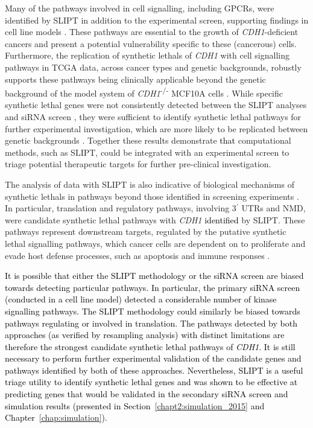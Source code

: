 Many of the pathways involved in cell signalling, including \glspl{GPCR}, were identified by \gls{SLIPT} in addition to the experimental screen, supporting findings in cell line models \citep{Telford2015}. These pathways are \gls{essential} to the growth of \textit{CDH1}-deficient cancers and present a potential vulnerability specific to these (cancerous) cells. Furthermore, the replication of \glspl{synthetic lethal} of \textit{CDH1} with cell signalling pathways in \gls{TCGA} data, across cancer types and genetic backgrounds, robustly supports these pathways being clinically applicable beyond the genetic background of the model system of \textit{CDH1}\textsuperscript{-/-} MCF10A cells \citep{Chen2014}. While specific \gls{synthetic lethal} genes were not consistently detected between the \gls{SLIPT} analyses and \gls{siRNA} screen \citep{Telford2015}, they were sufficient to identify \gls{synthetic lethal} pathways for further experimental investigation, which are more likely to be replicated between genetic backgrounds \citep{Dixon2008}. Together these results demonstrate \textcolor{black}{that} computational methods, such as \gls{SLIPT}, could be integrated with an experimental screen to triage potential therapeutic targets  for further pre-clinical investigation.

The analysis of  data with \gls{SLIPT} is also indicative of biological mechanisms of \glspl{synthetic lethal} in pathways beyond those identified in screening experiments \citep{Telford2015}. In particular, translation and regulatory pathways, involving 3$^\prime$ \glspl{UTR} and \gls{NMD}, were candidate \gls{synthetic lethal} pathways with \textit{CDH1} \textcolor{black}{identified} by \gls{SLIPT}. These pathways represent downstream targets, regulated by the putative \gls{synthetic lethal} signalling pathways, which cancer cells are dependent on to proliferate and evade host defense processes, such as apoptosis and immune responses \citep{Gao2015}.

\textcolor{black}{
It is possible that either the \gls{SLIPT} methodology or the \gls{siRNA} screen \citep{Telford2015} are biased towards detecting particular pathways. In particular, the primary \gls{siRNA} screen (conducted in a cell line model) detected a considerable number of kinase signalling pathways. The \gls{SLIPT} methodology could similarly be biased towards pathways regulating or involved in translation. The pathways detected by both approaches (as verified by resampling analysis) with distinct limitations are therefore the strongest candidate synthetic lethal pathways of \textit{CDH1}. It is still necessary to perform further experimental validation of the candidate genes and pathways identified by both of these approaches. Nevertheless, \gls{SLIPT} is a useful triage utility to identify synthetic lethal genes and was shown to be effective at predicting genes that would be validated in the secondary siRNA screen \citep{Telford2015} and simulation results (presented in Section~\ref{chapt2:simulation_2015} and Chapter~\ref{chap:simulation}).
}

